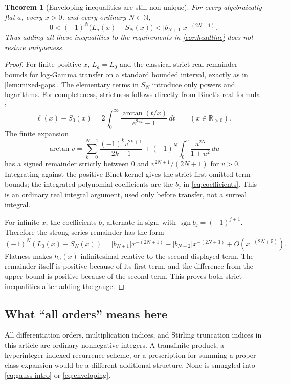 \documentclass[11pt,letterpaper]{article}
\numberwithin{equation}{section}
\newtheorem{theorem}{Theorem}[section]
\theoremstyle{plain}
\theoremstyle{definition}
\theoremstyle{remark}
\newcommand{\R}{\mathbb R}
\newcommand{\N}{\mathbb N}
\newcommand{\sgn}{\operatorname{sgn}}
\newcommand{\abs}[1]{\lvert#1\rvert}
\begin{document}
\begin{theorem}[Enveloping inequalities are still non-unique]
\label{thm:enveloping}
For every algebraically flat $a$, every $x>0$, and every ordinary $N\in\N$,
\begin{equation}\label{eq:enveloping}
 0<(-1)^N\bigl(L_a(x)-S_N(x)\bigr)
 <\abs{b_{N+1}}x^{-(2N+1)}.
\end{equation}
Thus adding all these inequalities to the requirements in
\cref{cor:headline} does not restore uniqueness.
\end{theorem}
\begin{proof}
For finite positive $x$, $L_a=L_0$ and the classical strict real remainder
bounds for log-Gamma \cite[\S5.11(ii)]{DLMF511} transfer on a standard
bounded interval, exactly as in \cref{lem:mixed-gaps}. The elementary
terms in $S_N$ introduce only powers and logarithms. For completeness, strictness follows directly from Binet's real formula
\cite[Eq.~5.9.10]{DLMF59}:
\[
 \ell(x)-S_0(x)=2\int_0^\infty
 \frac{\arctan(t/x)}{e^{2\pi t}-1}\,dt\qquad(x\in\R_{>0}).
\]
The finite expansion
\[
 \arctan v=\sum_{k=0}^{N-1}\frac{(-1)^k v^{2k+1}}{2k+1}
 +(-1)^N\int_0^v\frac{u^{2N}}{1+u^2}\,du
\]
has a signed remainder strictly between $0$ and $v^{2N+1}/(2N+1)$
for $v>0$. Integrating against the positive Binet kernel gives the
strict first-omitted-term bounds; the integrated polynomial coefficients
are the $b_j$ in \eqref{eq:coefficients}. This is an ordinary real
integral argument, used only before transfer, not a surreal integral.

For infinite $x$, the coefficients $b_j$ alternate in sign, with
$\sgn b_j=(-1)^{j+1}$. Therefore the strong-series remainder has the form
\[
 (-1)^N(L_0(x)-S_N(x))
 =\abs{b_{N+1}}x^{-(2N+1)}
  -\abs{b_{N+2}}x^{-(2N+3)}+O(x^{-(2N+5)}).
\]
Flatness makes $h_a(x)$ infinitesimal relative to the second displayed term.
The remainder itself is positive because of its first term, and the
difference from the upper bound is positive because of the second term.
This proves both strict inequalities after adding the gauge.
\end{proof}

\subsection{What ``all orders'' means here}
All differentiation orders, multiplication indices, and Stirling truncation
indices in this article are ordinary nonnegative integers. A transfinite
product, a hyperinteger-indexed recurrence scheme, or a prescription for
summing a proper-class expansion would be a different additional structure.
None is smuggled into \eqref{eq:gauss-intro} or \eqref{eq:enveloping}.
\end{document}
